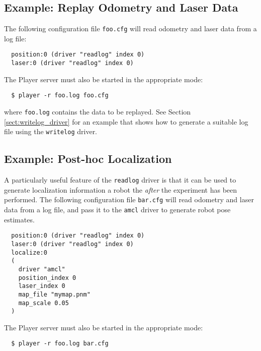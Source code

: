 \subsection*{Example: Replay Odometry and Laser Data}

The following configuration file {\tt foo.cfg} will read odometry and
laser data from a log file:
  \begin{verbatim}
  position:0 (driver "readlog" index 0)
  laser:0 (driver "readlog" index 0)
  \end{verbatim}
The Player server must also be started in the appropriate mode:
  \begin{verbatim}
  $ player -r foo.log foo.cfg
  \end{verbatim} %
where {\tt foo.log} contains the data to be replayed.  See Section
\ref{sect:writelog_driver} for an example that shows how to generate a
suitable log file using the {\tt writelog} driver.


\subsection*{Example: Post-hoc Localization}

A particularly useful feature of the {\tt readlog} driver is that it
can be used to generate localization information a robot the {\em
after} the experiment has been performed.  The following configuration
file {\tt bar.cfg} will read odometry and laser data from a log file,
and pass it to the {\tt amcl} driver to generate robot pose estimates.
  \begin{verbatim}
  position:0 (driver "readlog" index 0)
  laser:0 (driver "readlog" index 0)
  localize:0 
  (
    driver "amcl" 
    position_index 0 
    laser_index 0 
    map_file "mymap.pnm" 
    map_scale 0.05
  )
  \end{verbatim}
The Player server must also be started in the appropriate mode:
  \begin{verbatim}
  $ player -r foo.log bar.cfg
  \end{verbatim} %


